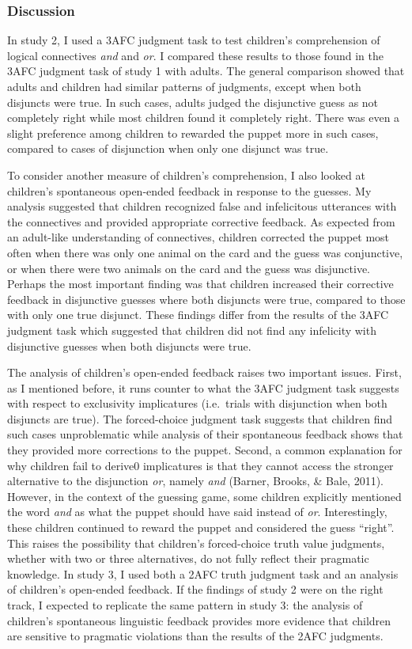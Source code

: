 \documentclass[man]{apa6}
\theoremstyle{definition}
\theoremstyle{definition}
\theoremstyle{definition}
\theoremstyle{remark}
\begin{document}
\subsubsection{Discussion}\label{discussion-1}

In study 2, I used a 3AFC judgment task to test children's comprehension
of logical connectives \emph{and} and \emph{or}. I compared these
results to those found in the 3AFC judgment task of study 1 with adults.
The general comparison showed that adults and children had similar
patterns of judgments, except when both disjuncts were true. In such
cases, adults judged the disjunctive guess as not completely right while
most children found it completely right. There was even a slight
preference among children to rewarded the puppet more in such cases,
compared to cases of disjunction when only one disjunct was true.

To consider another measure of children's comprehension, I also looked
at children's spontaneous open-ended feedback in response to the
guesses. My analysis suggested that children recognized false and
infelicitous utterances with the connectives and provided appropriate
corrective feedback. As expected from an adult-like understanding of
connectives, children corrected the puppet most often when there was
only one animal on the card and the guess was conjunctive, or when there
were two animals on the card and the guess was disjunctive. Perhaps the
most important finding was that children increased their corrective
feedback in disjunctive guesses where both disjuncts were true, compared
to those with only one true disjunct. These findings differ from the
results of the 3AFC judgment task which suggested that children did not
find any infelicity with disjunctive guesses when both disjuncts were
true.

The analysis of children's open-ended feedback raises two important
issues. First, as I mentioned before, it runs counter to what the 3AFC
judgment task suggests with respect to exclusivity implicatures
(i.e.~trials with disjunction when both disjuncts are true). The
forced-choice judgment task suggests that children find such cases
unproblematic while analysis of their spontaneous feedback shows that
they provided more corrections to the puppet. Second, a common
explanation for why children fail to derive0 implicatures is that they
cannot access the stronger alternative to the disjunction \emph{or},
namely \emph{and} (Barner, Brooks, \& Bale, 2011). However, in the
context of the guessing game, some children explicitly mentioned the
word \emph{and} as what the puppet should have said instead of
\emph{or}. Interestingly, these children continued to reward the puppet
and considered the guess \enquote{right}. This raises the possibility
that children's forced-choice truth value judgments, whether with two or
three alternatives, do not fully reflect their pragmatic knowledge. In
study 3, I used both a 2AFC truth judgment task and an analysis of
children's open-ended feedback. If the findings of study 2 were on the
right track, I expected to replicate the same pattern in study 3: the
analysis of children's spontaneous linguistic feedback provides more
evidence that children are sensitive to pragmatic violations than the
results of the 2AFC judgments.
\end{document}
